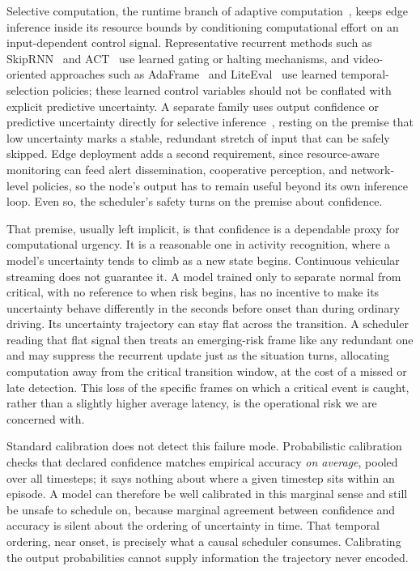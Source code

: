 \documentclass[a4paper,fleqn]{cas-dc}
\begin{document}
Selective computation, the runtime branch of adaptive
computation~\cite{han2022dynamic}, keeps edge inference inside its resource bounds
{\color{\revcolor}by conditioning computational effort on an input-dependent
control signal. Representative recurrent methods such as SkipRNN~\cite{campos2018skip}
and ACT~\cite{graves2016adaptive} use learned gating or halting mechanisms, and
video-oriented approaches such as AdaFrame~\cite{wu2019adaframe} and
LiteEval~\cite{wu2019liteeval} use learned temporal-selection policies; these learned
control variables should not be conflated with explicit predictive uncertainty. A
separate family uses output confidence or predictive uncertainty directly for
selective inference~\cite{geifman2017selective,rahmath2024earlyexit}, resting on the
premise that low uncertainty marks a stable, redundant stretch of input that can be
safely skipped.} Edge deployment adds a second requirement,
since resource-aware monitoring can feed alert dissemination, cooperative
perception, and network-level policies, so the node's output has to remain useful
beyond its own inference loop. Even so, the scheduler's safety turns on the
premise about confidence.

That premise, usually left implicit, is that confidence is a dependable proxy for
computational urgency. It is a reasonable one in activity recognition, where a
model's uncertainty tends to climb as a new state begins. Continuous vehicular
streaming does not guarantee it. A model trained only to separate normal from
critical, with no reference to when risk begins, has no incentive to make its
uncertainty behave differently in the seconds before onset than during ordinary
driving. Its uncertainty trajectory can stay flat across the transition. A scheduler
reading that flat signal then treats an emerging-risk frame like any redundant one
and may suppress the recurrent update just as the situation turns, allocating computation away from the critical transition window, at the cost of a missed or late detection. This loss of the specific frames on which
a critical event is caught, rather than a slightly higher average latency, is the
operational risk we are concerned with.

Standard calibration does not detect this failure mode. Probabilistic
calibration~\cite{guo2017calibration} checks that declared confidence matches
empirical accuracy \emph{on average}, pooled over all timesteps; it says nothing
about where a given timestep sits within an episode. A model can therefore be
well calibrated in this marginal sense and still be unsafe to schedule on, because
marginal agreement between confidence and accuracy is silent about the ordering of
uncertainty in time. That temporal ordering, near onset, is precisely what a
causal scheduler consumes. Calibrating the output probabilities cannot supply
information the trajectory never encoded.
\end{document}
